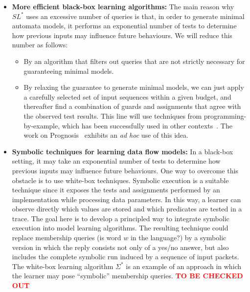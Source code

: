 \documentclass[11pt]{article}
\newcommand{\FIX}[1]{\textcolor{red}{\textbf{#1}}}
\newcommand{\system}[1]{\mbox{\textsf{#1}}}
\begin{document}
\begin{itemize}
\item
  {\bf More efficient black-box learning algorithms:}
  The main reason why $SL^*$ uses an excessive number of queries is that, in
  order to generate minimal automata models, it performs an exponential number
  of tests to determine how previous inputs may influence future behaviours.
  We will reduce this number as follows:
  \begin{itemize}
  \item
    By an algorithm that filters out queries that are not strictly necessary
    for guaranteeing minimal models.
  \item
    By relaxing the guarantee to generate minimal models, we can just apply a carefully selected set of input sequences within a given budget, and thereafter find a combination of guards and assignments that agree with the observed test results. This line will use techniques from programming-by-example, which has been successfully used in other contexts~\cite{GulwaniPS17}. The work on Prognosis~\cite{Prognosis@SIGCOMM-21} exhibits an \emph{ad hoc} use of this idea.
  \end{itemize}
\item
  {\bf Symbolic techniques for learning data flow models:}
  In a black-box setting, it may take an exponential number of tests to determine how previous inputs may influence future behaviours. One way to overcome this obstacle is to use white-box techniques. Symbolic execution is a suitable technique since it exposes the tests and assignments performed by an implementation while processing data parameters.
In this way, a learner can observe directly which values are stored and which predicates are tested in a trace.
The goal here is to develop a principled way to integrate symbolic execution into model learning algorithms.
The resulting technique could replace membership queries (is word $w$ in the language?) by a symbolic
version in which the reply consists not
only of a yes/no answer, but also includes the complete symbolic run induced by a
sequence of input packets.
The white-box learning algorithm $\Sigma^\ast$ \cite{BotincanB13} is an example of an approach in which the learner may pose ``symbolic'' membership queries.
\FIX{TO BE CHECKED OUT}
\end{itemize}
\end{document}
